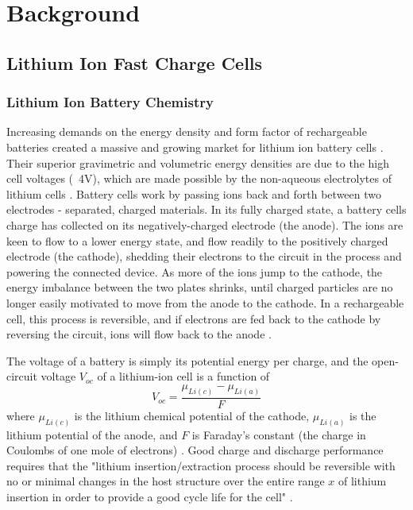 \chapter{Background}

\section{Lithium Ion Fast Charge Cells}

\subsection{Lithium Ion Battery Chemistry}
Increasing demands on the energy density and form factor of rechargeable batteries created a massive and growing market for lithium ion battery cells \cite{LBST}. 
Their superior gravimetric and volumetric energy densities are due to the high cell voltages (~4V), which are made possible by the non-aqueous electrolytes of lithium cells \cite{LBST}. 
Battery cells work by passing ions back and forth between two electrodes - separated, charged materials. In its fully charged state, a battery cells charge has collected on its negatively-charged electrode (the anode). 
The ions are keen to flow to a lower energy state, and flow readily to the positively charged electrode (the cathode), shedding their electrons to the circuit in the process and powering the connected device. 
As more of the ions jump to the cathode, the energy imbalance between the two plates shrinks, until charged particles are no longer easily motivated to move from the anode to the cathode. 
In a rechargeable cell, this process is reversible, and if electrons are fed back to the cathode by reversing the circuit, ions will flow back to the anode \cite{LBST}. 

The voltage of a battery is simply its potential energy per charge, and the open-circuit voltage $V_{oc}$ of a lithium-ion cell is a function of
$$ V_{oc} = \frac{\mu _{Li(c)} - \mu _{Li(a)}}{F} $$
where $\mu_{Li(c)}$ is the lithium chemical potential of the cathode, $\mu_{Li(a)}$ is the lithium potential of the anode, and $F$ is Faraday's constant (the charge in Coulombs of one mole of electrons) \cite{LBST}.
Good charge and discharge performance requires that the "lithium insertion/extraction process should be reversible with no or minimal changes in the host structure over the entire range $x$ of lithium insertion in order to provide a good cycle life for the cell" \cite{LBST}.

